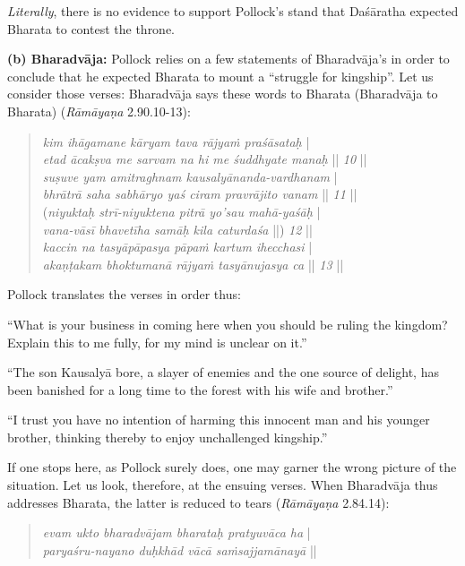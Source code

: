{\sl Literally}, there is no evidence to support Pollock’s stand that Daśāratha expected Bharata to contest the throne. 

\newpage

\noindent
\textbf{(b) Bharadvāja:} Pollock relies on a few statements of Bharadvāja’s in order to conclude that he expected Bharata to mount a “struggle for kingship”. Let us consider those verses: Bharadvāja says these words to Bharata (Bharadvāja to Bharata) ({\sl Rāmāyaṇa} 2.90.10-13): 
\begin{quote}
{{\sl kim ihāgamane kāryam tava rājyaṁ praśāsataḥ}} |\\
{{\sl etad ācakṣva me sarvam na hi me śuddhyate manaḥ}} || {\sl 10} ||\\
{\sl suṣuve yam amitraghnam kausalyānanda-vardhanam} |\\
{\sl bhrātrā saha sabhāryo yaś ciram pravrājito vanam} || {\sl 11} ||\\
({\sl niyuktaḥ strī-niyuktena pitrā yo’sau mahā-yaśāḥ} |\\
{\sl vana-vāsī bhavetīha samāḥ kila caturdaśa} ||) {\sl 12} ||\\
{\sl kaccin na tasyāpāpasya pāpaṁ kartum ihecchasi} |\\
{\sl akaṇṭakam bhoktumanā rājyaṁ tasyānujasya ca} || {\sl 13} ||
\end{quote}

Pollock translates the verses in order thus:

\begin{myquote}
“What is your business in coming here when you should be ruling the kingdom? Explain this to me fully, for my mind is unclear on it.” 

“The son Kausalyā bore, a slayer of enemies and the one source of delight, has been banished for a long time to the forest with his wife and brother.”			 

“I trust you have no intention of harming this innocent man and his younger brother, thinking thereby to enjoy unchallenged kingship.”
\end{myquote}

If one stops here, as Pollock surely does, one may garner the wrong picture of the situation. Let us look, therefore, at the ensuing verses. When Bharadvāja thus addresses Bharata, the latter is reduced to tears ({\sl Rāmāyaṇa} 2.84.14):
\begin{quote}
{{\sl evam ukto bharadvājam bharataḥ pratyuvāca ha}} |\\
{\sl paryaśru-nayano duḥkhād vācā saṁsajjamānayā} || 
\end{quote}

